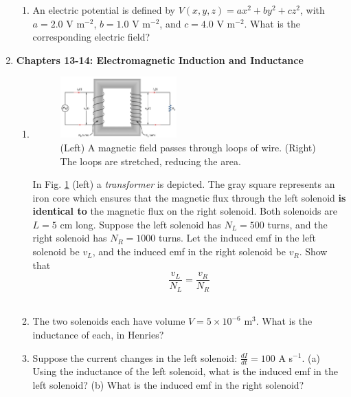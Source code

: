 \documentclass[10pt]{article}
\begin{document}
\begin{enumerate}
\begin{enumerate}
\item An electric potential is defined by $V(x,y,z) = a x^2 + b y^2 + c z^2$, with $a = 2.0$ V m$^{-2}$, $b = 1.0$ V m$^{-2}$, and $c = 4.0$ V m$^{-2}$.  What is the corresponding electric field? \\ \vspace{2cm}
\end{enumerate}
\item \textbf{Chapters 13-14: Electromagnetic Induction and Inductance}
\begin{enumerate}
\item 
\begin{figure}
\centering
\includegraphics[width=0.45\textwidth]{transformer.png}
\caption{\label{fig:trans} (Left) A magnetic field passes through loops of wire.  (Right) The loops are stretched, reducing the area.}
\end{figure}
In Fig. \ref{fig:trans} (left) a \textit{transformer} is depicted.  The gray square represents an iron core which ensures that the magnetic flux through the left solenoid \textbf{is identical to} the magnetic flux on the right solenoid.  Both solenoids are $L = 5$ cm long.  Suppose the left solenoid has $N_L = 500$ turns, and the right solenoid has $N_R = 1000$ turns.  Let the induced emf in the left solenoid be $v_L$, and the induced emf in the right solenoid be $v_R$.  Show that
\begin{equation}
\frac{v_L}{N_L} = \frac{v_R}{N_R}
\end{equation} \\ \vspace{3cm}
\item The two solenoids each have volume $V = 5 \times 10^{-6}$ m$^3$.  What is the inductance of each, in Henries? \\ \vspace{3cm}
\item Suppose the current changes in the left solenoid: $\frac{dI}{dt} = 100$ A s$^{-1}$.  (a) Using the inductance of the left solenoid, what is the induced emf in the left solenoid? (b) What is the induced emf in the right solenoid? \\ \vspace{4cm}
\end{enumerate}
\end{enumerate}
\end{document}
